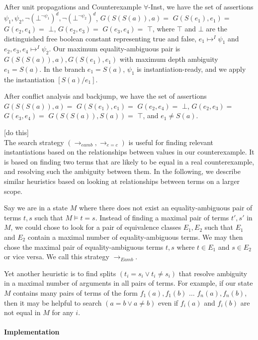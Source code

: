 \documentclass{llncs}
\begin{document}
After unit propagations and Counterexample $\forall$-Inst, we have the set of assertions $\psi_1, \psi_2, \neg ( \bot^{\neg \psi_1 })^d, \neg ( \bot^{\neg \psi_2 })^d$, $G( S(S(a)), a) =$ $G( S(e_1), e_1) =$ $G( e_2, e_4 ) =$ $\bot$, $G( e_2, e_3 ) =$ $G( e_3, e_4 ) =$ $\top$, where $\top$ and $\bot$ are the distinguished free boolean constant representing true and false, $e_1 \mapsto^I \psi_1$ and $e_2, e_3, e_4 \mapsto^I \psi_2$.
Our maximum equality-ambiguous pair is $G( S(S(a)), a), G( S(e_1), e_1)$ with maximum depth ambiguity $e_1 = S( a )$.
In the branch $e_1 = S( a )$, $\psi_1$ is instantiation-ready, and we apply the instantiation $[S(a)/e_1]$.

After conflict analysis and backjump, we have the set of assertions $G( S(S(a)), a) =$ $G( S(e_1), e_1) =$ $G( e_2, e_4 ) =$ $\bot$, $G( e_2, e_3 ) =$ $G( e_3, e_4 ) =$ $G( S( S( a ) ), S( a )) =$ $\top$, and $e_1 \neq S( a )$.

[do this] \\

The search strategy $( \rightarrow_{eamb}, \rightarrow_{e=c} )$ is useful for finding relevant instantiations based on the relationships between values in our counterexample.
It is based on finding two terms that are likely to be equal in a real counterexample, and resolving such the ambiguity between them.
In the following, we describe similar heuristics based on looking at relationships between terms on a larger scope.

Say we are in a state $M$ where there does not exist an equality-ambiguous pair of terms $t,s$ such that $M \models t = s$.
Instead of finding a maximal pair of terms $t',s'$ in $M$, we could chose to look for a pair of equivalence classes $E_1, E_2$ such that $E_1$ and $E_2$ contain a maximal number of equality-ambiguous terms.
We may then chose the maximal pair of equality-ambiguous terms $t,s$ where $t \in E_1$ and $s \in E_2$ or vice versa.
We call this strategy $\rightarrow_{Eamb}$.

Yet another heuristic is to find splits $( t_i = s_i \vee t_i \neq s_i )$ that resolve ambiguity in a maximal number of arguments in all pairs of terms.
For example, if our state $M$ contains many pairs of terms of the form $f_1( a ), f_1( b )$ $\ldots$ $f_n( a ), f_n( b )$, then it may be helpful to search $( a = b \vee a \neq b )$ even if $f_i( a )$ and $f_i( b )$ are not equal in $M$ for any $i$.

\paragraph{Implementation}
\end{document}
